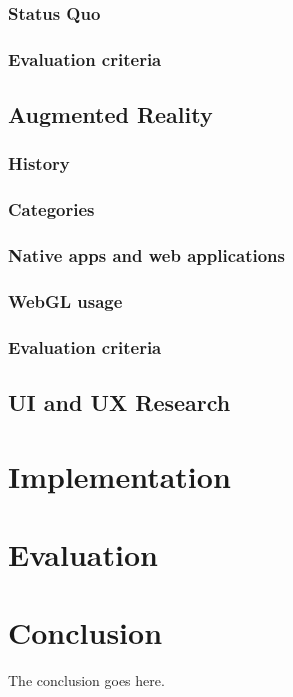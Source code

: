 \documentclass[12pt,journal,compsoc]{IEEEtran}
\begin{document}
\subsubsection{Status Quo}

\subsubsection{Evaluation criteria}

\subsection{Augmented Reality}

\subsubsection{History}

\subsubsection{Categories}

\subsubsection{Native apps and web applications}

\subsubsection{WebGL usage}

\subsubsection{Evaluation criteria}

\subsection{UI and UX Research}




\section{Implementation}


\section{Evaluation}


\section{Conclusion}
The conclusion goes here.
\end{document}
